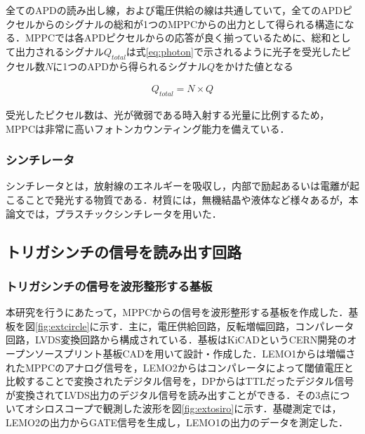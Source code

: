 全てのAPDの読み出し線，および電圧供給の線は共通していて，全てのAPDピクセルからのシグナルの総和が1つのMPPCからの出力として得られる構造になる．MPPCでは各APDピクセルからの応答が良く揃っているために、総和として出力されるシグナル$Q_{total}$は式\ref{eq:photon}で示されるように光子を受光したピクセル数$N$に1つのAPDから得られるシグナル$Q$をかけた値となる

\begin{eqnarray}
  Q_{total} = N \times Q
\end{eqnarray}

受光したピクセル数は、光が微弱である時入射する光量に比例するため， MPPCは非常に高いフォトンカウンティング能力を備えている．

\subsubsection*{シンチレータ}
シンチレータとは，放射線のエネルギーを吸収し，内部で励起あるいは電離が起こることで発光する物質である．材質には，無機結晶や液体など様々あるが，本論文では，プラスチックシンチレータを用いた．



\subsection{トリガシンチの信号を読み出す回路}
\subsubsection*{トリガシンチの信号を波形整形する基板}
本研究を行うにあたって，MPPCからの信号を波形整形する基板を作成した．基板を図\ref{fig:extcircle}に示す．主に，電圧供給回路，反転増幅回路，コンパレータ回路，LVDS変換回路から構成されている．基板はKiCADというCERN開発のオープンソースプリント基板CADを用いて設計・作成した．LEMO1からは増幅されたMPPCのアナログ信号を，LEMO2からはコンパレータによって閾値電圧と比較することで変換されたデジタル信号を，DPからはTTLだったデジタル信号が変換されてLVDS出力のデジタル信号を読み出すことができる．その3点についてオシロスコープで観測した波形を図\ref{fig:extosiro}に示す．基礎測定では，LEMO2の出力からGATE信号を生成し，LEMO1の出力のデータを測定した．

